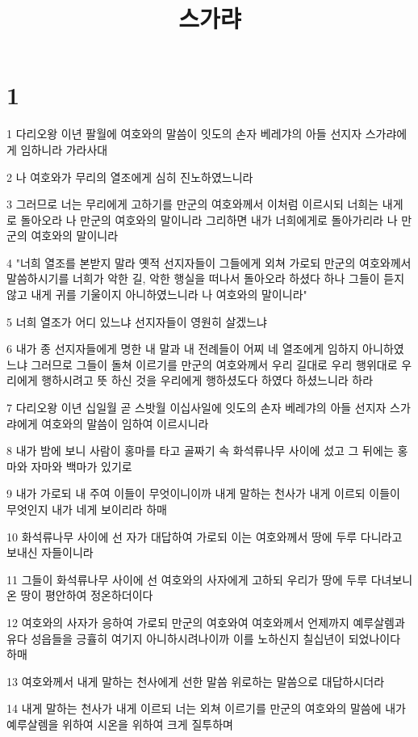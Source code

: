 

\title{스가랴}


\chapter{1}

\par 1 다리오왕 이년 팔월에 여호와의 말씀이 잇도의 손자 베레갸의 아들 선지자 스가랴에게 임하니라 가라사대
\par 2 나 여호와가 무리의 열조에게 심히 진노하였느니라
\par 3 그러므로 너는 무리에게 고하기를 만군의 여호와께서 이처럼 이르시되 너희는 내게로 돌아오라 나 만군의 여호와의 말이니라 그리하면 내가 너희에게로 돌아가리라 나 만군의 여호와의 말이니라
\par 4 "너희 열조를 본받지 말라 옛적 선지자들이 그들에게 외쳐 가로되 만군의 여호와께서 말씀하시기를 너희가 악한 길, 악한 행실을 떠나서 돌아오라 하셨다 하나 그들이 듣지 않고 내게 귀를 기울이지 아니하였느니라 나 여호와의 말이니라"
\par 5 너희 열조가 어디 있느냐 선지자들이 영원히 살겠느냐
\par 6 내가 종 선지자들에게 명한 내 말과 내 전례들이 어찌 네 열조에게 임하지 아니하였느냐 그러므로 그들이 돌쳐 이르기를 만군의 여호와께서 우리 길대로 우리 행위대로 우리에게 행하시려고 뜻 하신 것을 우리에게 행하셨도다 하였다 하셨느니라 하라
\par 7 다리오왕 이년 십일월 곧 스밧월 이십사일에 잇도의 손자 베레갸의 아들 선지자 스가랴에게 여호와의 말씀이 임하여 이르시니라
\par 8 내가 밤에 보니 사람이 홍마를 타고 골짜기 속 화석류나무 사이에 섰고 그 뒤에는 홍마와 자마와 백마가 있기로
\par 9 내가 가로되 내 주여 이들이 무엇이니이까 내게 말하는 천사가 내게 이르되 이들이 무엇인지 내가 네게 보이리라 하매
\par 10 화석류나무 사이에 선 자가 대답하여 가로되 이는 여호와께서 땅에 두루 다니라고 보내신 자들이니라
\par 11 그들이 화석류나무 사이에 선 여호와의 사자에게 고하되 우리가 땅에 두루 다녀보니 온 땅이 평안하여 정온하더이다
\par 12 여호와의 사자가 응하여 가로되 만군의 여호와여 여호와께서 언제까지 예루살렘과 유다 성읍들을 긍휼히 여기지 아니하시려나이까 이를 노하신지 칠십년이 되었나이다 하매
\par 13 여호와께서 내게 말하는 천사에게 선한 말씀 위로하는 말씀으로 대답하시더라
\par 14 내게 말하는 천사가 내게 이르되 너는 외쳐 이르기를 만군의 여호와의 말씀에 내가 예루살렘을 위하여 시온을 위하여 크게 질투하며
